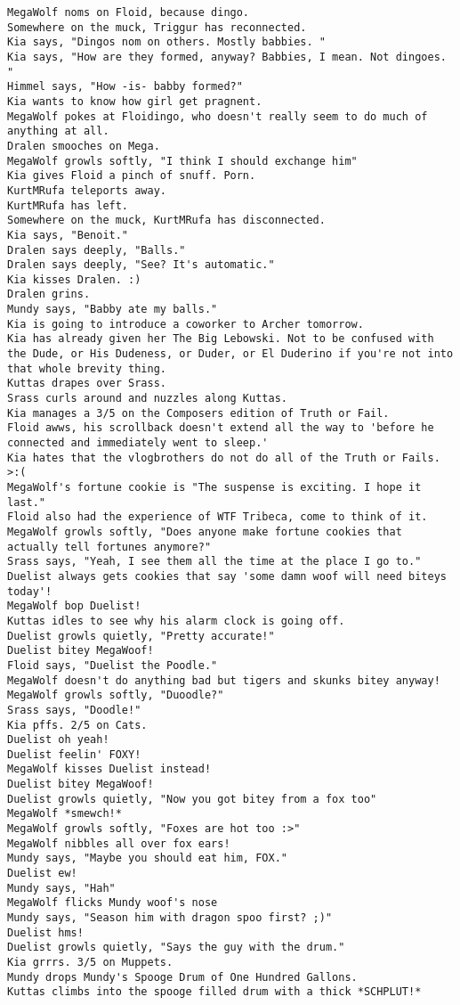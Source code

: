 \begin{verbatim}
MegaWolf noms on Floid, because dingo.
Somewhere on the muck, Triggur has reconnected.
Kia says, "Dingos nom on others. Mostly babbies. "
Kia says, "How are they formed, anyway? Babbies, I mean. Not dingoes. "
Himmel says, "How -is- babby formed?"
Kia wants to know how girl get pragnent.
MegaWolf pokes at Floidingo, who doesn't really seem to do much of anything at all.
Dralen smooches on Mega.
MegaWolf growls softly, "I think I should exchange him"
Kia gives Floid a pinch of snuff. Porn.
KurtMRufa teleports away.
KurtMRufa has left.
Somewhere on the muck, KurtMRufa has disconnected.
Kia says, "Benoit."
Dralen says deeply, "Balls."
Dralen says deeply, "See? It's automatic."
Kia kisses Dralen. :)
Dralen grins.
Mundy says, "Babby ate my balls."
Kia is going to introduce a coworker to Archer tomorrow.
Kia has already given her The Big Lebowski. Not to be confused with the Dude, or His Dudeness, or Duder, or El Duderino if you're not into that whole brevity thing.
Kuttas drapes over Srass.
Srass curls around and nuzzles along Kuttas.
Kia manages a 3/5 on the Composers edition of Truth or Fail.
Floid awws, his scrollback doesn't extend all the way to 'before he connected and immediately went to sleep.'
Kia hates that the vlogbrothers do not do all of the Truth or Fails. >:(
MegaWolf's fortune cookie is "The suspense is exciting. I hope it last."
Floid also had the experience of WTF Tribeca, come to think of it.
MegaWolf growls softly, "Does anyone make fortune cookies that actually tell fortunes anymore?"
Srass says, "Yeah, I see them all the time at the place I go to."
Duelist always gets cookies that say 'some damn woof will need biteys today'!
MegaWolf bop Duelist!
Kuttas idles to see why his alarm clock is going off.
Duelist growls quietly, "Pretty accurate!"
Duelist bitey MegaWoof!
Floid says, "Duelist the Poodle."
MegaWolf doesn't do anything bad but tigers and skunks bitey anyway!
MegaWolf growls softly, "Duoodle?"
Srass says, "Doodle!"
Kia pffs. 2/5 on Cats.
Duelist oh yeah!
Duelist feelin' FOXY!
MegaWolf kisses Duelist instead!
Duelist bitey MegaWoof!
Duelist growls quietly, "Now you got bitey from a fox too"
MegaWolf *smewch!*
MegaWolf growls softly, "Foxes are hot too :>"
MegaWolf nibbles all over fox ears!
Mundy says, "Maybe you should eat him, FOX."
Duelist ew!
Mundy says, "Hah"
MegaWolf flicks Mundy woof's nose
Mundy says, "Season him with dragon spoo first? ;)"
Duelist hms!
Duelist growls quietly, "Says the guy with the drum."
Kia grrrs. 3/5 on Muppets.
Mundy drops Mundy's Spooge Drum of One Hundred Gallons.
Kuttas climbs into the spooge filled drum with a thick *SCHPLUT!*

\end{verbatim}
